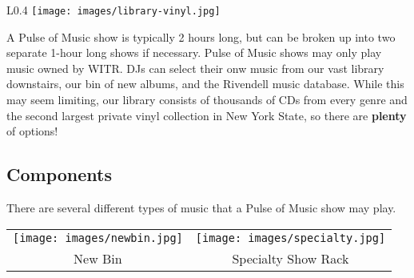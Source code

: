\documentclass{witrman}
\begin{document}
\begin{wrapfigure}{L}{0.4\linewidth}
    \centering
    \texttt{[image: images/library-vinyl.jpg]}
\end{wrapfigure}

A Pulse of Music show is typically 2 hours long, but can be broken up into two
separate 1-hour long shows if necessary.  Pulse of Music shows may only play
music owned by WITR\@.  DJs can select their onw music from our vast library
downstairs, our bin of new albums, and the Rivendell music database.  While this 
may seem limiting, our library consists of thousands of CDs from
every genre and the second largest private vinyl collection in
New York State, so there are \textbf{plenty} of options!

\subsection{Components}

There are several different types of music that a Pulse of Music show may
play.
\begin{itemize}
\end{itemize}

\begin{tabular}{cc}
    \texttt{[image: images/newbin.jpg]} &
    \texttt{[image: images/specialty.jpg]} \\

    New Bin &
    Specialty Show Rack \\
\end{tabular}
\end{document}
